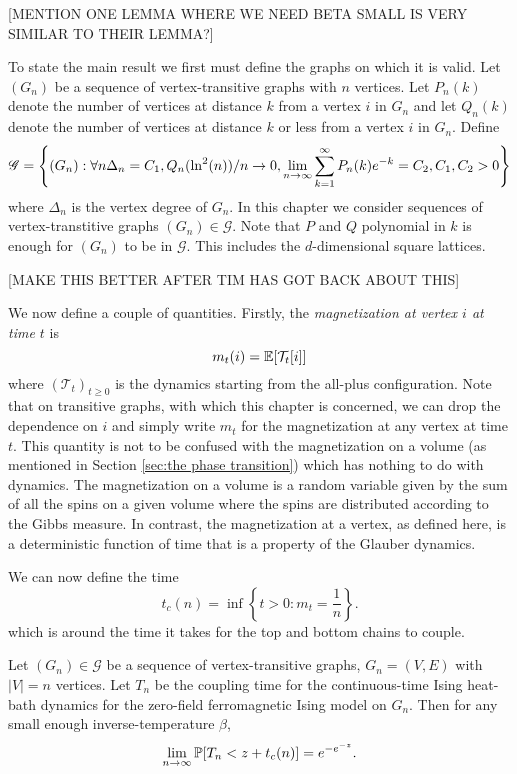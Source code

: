 [MENTION ONE LEMMA WHERE WE NEED BETA SMALL IS VERY SIMILAR TO THEIR LEMMA?]

To state the main result we first must define the graphs on which it is valid. Let $(G_{n})$ be a sequence of vertex-transitive graphs with $n$ vertices. Let $P_n(k)$ denote the number of vertices at distance $k$ from a vertex $i$ in $G_n$ and let $Q_n(k)$ denote the number of vertices at distance $k$ or less from a vertex $i$ in $G_n$. Define
\begin{equation}
	\mathscr{G} = \left\{(G_n) : \forall n \Delta_n = C_1, Q_n(\ln^2(n))/n \rightarrow 0, \lim_{n \rightarrow \infty}\sum_{k = 1}^\infty P_n(k)e^{-k} = C_2, C_1, C_2 > 0\right\}
	\label{eq:set valid graphs}
\end{equation}
where $\Delta_n$ is the vertex degree of $G_n$.
In this chapter we consider sequences of vertex-transtitive graphs $(G_n) \in \mathscr{G}$. Note that $P$ and $Q$ polynomial in $k$ is enough for $(G_n)$ to be in $\mathscr{G}$. This includes the $d$-dimensional square lattices.

[MAKE THIS BETTER AFTER TIM HAS GOT BACK ABOUT THIS]

We now define a couple of quantities. Firstly, the \emph{magnetization at vertex $i$ at time $t$} is
\begin{equation}
	 	m_t(i) = \mathbb{E}[\mathcal{T}_t[i]]
\end{equation} 
where $(\mathcal{T}_t)_{t \geq 0}$ is the dynamics starting from the all-plus configuration. Note that on transitive graphs, with which this chapter is concerned, we can drop the dependence on $i$ and simply write $m_t$ for the magnetization at any vertex at time $t$. This quantity is not to be confused with the magnetization on a volume (as mentioned in Section \ref{sec:the phase transition}) which has nothing to do with dynamics. The magnetization on a volume is a random variable given by the sum of all the spins on a given volume where the spins are distributed according to the Gibbs measure. In contrast, the magnetization at a vertex, as defined here, is a deterministic function of time that is a property of the Glauber dynamics.

We can now define the time
\begin{equation}
	\label{eq:definition t_c(n)}
	t_c(n) = \inf\left\{ t > 0 : m_t = \frac{1}{n}\right\}.
\end{equation}
which is around the time it takes for the top and bottom chains to couple.

\begin{theorem}
\label{thm:Coupling Distribution on transitive graph}
	Let $(G_n) \in \mathscr{G}$ be a sequence of vertex-transitive graphs, $G_n = (V, E)$ with $|V| = n$ vertices. Let $T_n$ be the coupling time for the continuous-time Ising heat-bath dynamics for the zero-field ferromagnetic Ising model on $G_n$. Then for any small enough inverse-temperature $\beta$,
	\begin{equation}
		\lim_{n \rightarrow \infty} \mathbb{P}[T_n < z + t_c(n)] = e^{-e^{-z}}.
	\end{equation}
\end{theorem}

